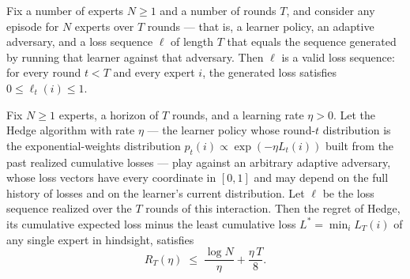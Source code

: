 \begin{theorem}
\label{Episode.losses_valid}
\leanok
{}
Fix a number of experts $N \ge 1$ and a number of rounds $T$, and consider any episode
for $N$ experts over $T$ rounds — that is, a learner policy, an adaptive adversary, and
a loss sequence $\ell$ of length $T$ that equals the sequence generated by running that
learner against that adversary. Then $\ell$ is a valid loss sequence: for every round $t
< T$ and every expert $i$, the generated loss satisfies $0 \le \ell_t(i) \le 1$.
\end{theorem}

\begin{theorem}
\label{hedge_regret_bound_tight_episode}
\leanok
{}
Fix $N \ge 1$ experts, a horizon of $T$ rounds, and a learning rate $\eta > 0$. Let the
Hedge algorithm with rate $\eta$ — the learner policy whose round-$t$ distribution is
the exponential-weights distribution $p_t(i) \propto \exp(-\eta L_t(i))$ built from the
past realized cumulative losses — play against an arbitrary adaptive adversary, whose
loss vectors have every coordinate in $[0,1]$ and may depend on the full history of
losses and on the learner's current distribution. Let $\ell$ be the loss sequence
realized over the $T$ rounds of this interaction. Then the regret of Hedge, its
cumulative expected loss minus the least cumulative loss $L^* = \min_{i} L_T(i)$ of any
single expert in hindsight, satisfies
\[
  R_T(\eta) \;\le\; \frac{\log N}{\eta} + \frac{\eta\, T}{8}.
\]
\end{theorem}

